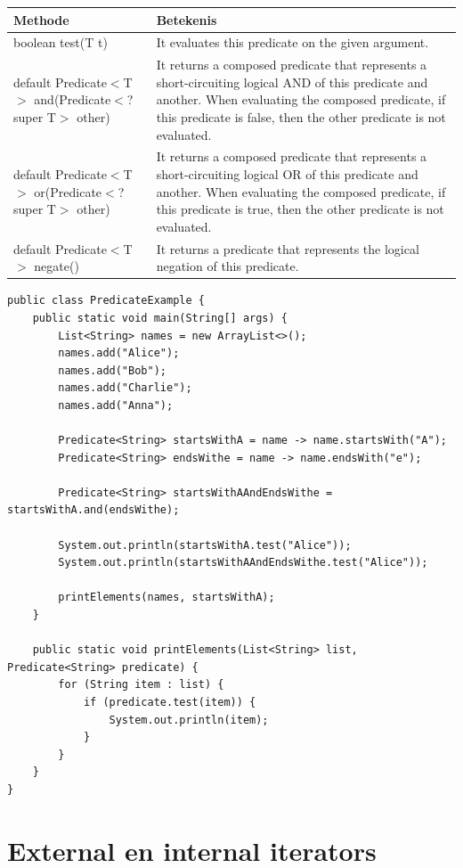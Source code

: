 \begin{table}[h!]
\centering
\begin{tabularx}{\textwidth}{| l | X |}
 \hline
 Methode & Betekenis\\ 
 \hline
 boolean test(T t) &	It evaluates this predicate on the given argument.\\
 \hline
 default Predicate$<$T$>$ and(Predicate$<$? super T$>$ other)	& It returns a composed predicate that represents a short-circuiting logical AND of this predicate and another. When evaluating the composed predicate, if this predicate is false, then the other predicate is not evaluated.\\
\hline
 default Predicate$<$T$>$ or(Predicate$<$? super T$>$ other) &	It returns a composed predicate that represents a short-circuiting logical OR of this predicate and another. When evaluating the composed predicate, if this predicate is true, then the other predicate is not evaluated.\\
  \hline
 default Predicate$<$T$>$ negate()	& It returns a predicate that represents the logical negation of this predicate.\\
  \hline
\end{tabularx}
\end{table}


\begin{lstlisting}
public class PredicateExample {
    public static void main(String[] args) {
        List<String> names = new ArrayList<>();
        names.add("Alice");
        names.add("Bob");
        names.add("Charlie");
        names.add("Anna");

        Predicate<String> startsWithA = name -> name.startsWith("A");
        Predicate<String> endsWithe = name -> name.endsWith("e");

        Predicate<String> startsWithAAndEndsWithe = startsWithA.and(endsWithe);

        System.out.println(startsWithA.test("Alice"));
        System.out.println(startsWithAAndEndsWithe.test("Alice"));

        printElements(names, startsWithA);
    }
    
    public static void printElements(List<String> list, Predicate<String> predicate) {
        for (String item : list) {
            if (predicate.test(item)) {
                System.out.println(item);
            }
        }
    }
}
\end{lstlisting}


\section{External en internal iterators}

